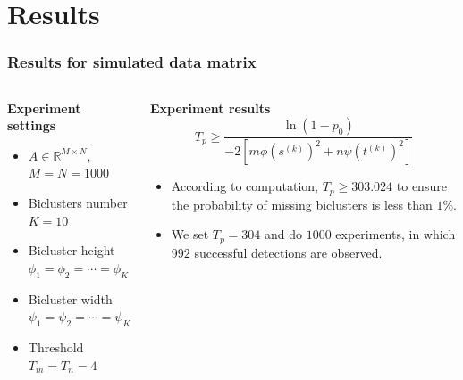 \documentclass{beamer}
\begin{document}
\section{Results}
\begin{frame}
    \frametitle{Results for simulated data matrix}
    \begin{columns}[T]
        \begin{column}{0.5\textwidth}
            \centering
            \textbf{Experiment settings}
            \begin{itemize}
                \item $A \in \mathbb{R}^{M\times N}$, $M = N = 1000$
                \item Biclusters number $K = 10$
                \item Bicluster height $\phi_1 = \phi_2 = \cdots = \phi_K = \phi$
                \item Bicluster width $\psi_1 = \psi_2 = \cdots = \psi_K = \psi$
                \item Threshold $T_m = T_n = 4$
            \end{itemize}
        \end{column}
        \begin{column}{0.5\textwidth}
            \textbf{Experiment results}
            $$ T_p \ge \frac{\ln(1 - p_0)}{-2 [m\phi (s^{(k)})^2+ n\psi (t^{(k)})^2]} $$
            \begin{itemize}
                \item
                      According to computation, $T_p \ge 303.024$ to ensure the probability of missing biclusters is less than $1\%$.
                \item
                      We set $T_p = 304$ and do $1000$ experiments, in which $992$ successful detections are observed.
            \end{itemize}
        \end{column}
    \end{columns}
\end{frame}
\end{document}
